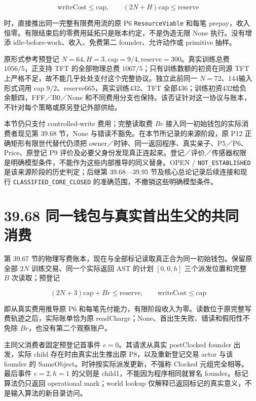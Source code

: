 \documentclass[
  11pt,
  oneside]{book}
\begin{document}
\[\text{writeCost}\le\mathrm{cap},\qquad
(2N+H)\mathrm{cap}\le\mathrm{reserve}\]

时，直接推出同一完整有限费用流的原 P6 \nolinkurl{ResourceViable} 和每笔 prepay，收入恒零。有限结束后的零费用延拓只是账本约定，不是伪造无限 None 执行。没有增添 idle-before-work、收入、免费第二 founder、允许动作或 primitive 抽样。

原形式参考预登记 \(N=64,H=3,\mathrm{cap}=9/4,\mathrm{reserve}=300\)。真实训练总费 \(1056/5\)，正支持 TFT 的全部物理总费 \(1067/5\)；只有训练数额的初资在同源 TFT 上严格不足，故不能几乎处处支付这个完整协议。独立此前同一 \(N=72\)、144输入形式词用 cap \(9/2\)、reserve665，真实训练432、TFT 全部436；训练初资432给负余额四，FFF／B0／None 和不同费用分支也保持。该否证针对这一协议与账本，不针对每个策略或原另登记外部供给。

本节仍只支付 controlled-write 费用；完整读取费 \(B r\) 接入同一初始钱包的实际消费者现见第 39.68 节，None 与错读不豁免。在本节所记录的来源阶段，原 P12 正确矩形有限世代替代仍须把 owner／时钟、同一返回程序、真实亲子、P5／P6、Price、原登记 P9 评价及必要父身份发现真正连起来。登记／评价／传感器权限是明确模型条件，不能作为这些内部推导的同义替身。OPEN / \nolinkurl{NOT_ESTABLISHED} 是该来源阶段的历史判定；后继第 39.68---39.95 节及核心总论记录后续连接和现行 \nolinkurl{CLASSIFIED_CORE_CLOSED} 的准确范围，不撤销这些明确模型条件。

\section{39.68 同一钱包与真实首出生父的共同消费}\label{ux540cux4e00ux94b1ux5305ux4e0eux771fux5b9eux9996ux51faux751fux7236ux7684ux5171ux540cux6d88ux8d39}

第 39.67 节的物理写费账本，现在与全部标记读取真正合为同一初始钱包。保留原全部 \(2N\) 训练交易、同一个实际返回 AST 的计划 \([0,0,h]\) 三个派发位置和完整 \(B\) 次读取；预登记

\[(2N+3)\mathrm{cap}+B r\le\mathrm{reserve},
\qquad \text{writeCost}\le\mathrm{cap}\]

即从真实费用推导原 P6 和每笔先付能力，有限阶段收入为零。读数位于原完整写费轨迹之后，实际账单恰为原 readCharge；None、首出生失败、错读和假阳性不免除 \(B r\)，也没有第二个观察账户。

主同父消费者固定预登记首事件 \(e=0\)。其请求从真实 postClocked founder 出发，实际 child 存在时由真实出生推出原 P8，以及重新登记交易 actor 与该 founder 的 SameObject。时钟按实际派发更新，不强称 Clocked 元组完全相等。最后事件 \(e=2,h=1\) 的父则是 child1，不能因为程序相同就冒名 founder。标记算法仍只返回 operational mark；world lookup 仅解释已返回标记的真实意义，不是输入算法的新目录访问。
\end{document}
